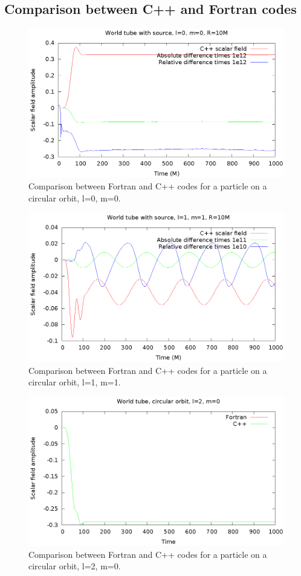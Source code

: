 \subsection{Comparison between C++ and Fortran codes}
\begin{figure}
  \includegraphics{wtcircl0m0}
  \caption{Comparison between Fortran and C++ codes for a particle on a circular orbit, l=0, m=0.}
\end{figure}
\begin{figure}
  \includegraphics{wtcircl1m1}
  \caption{Comparison between Fortran and C++ codes for a particle on a circular orbit, l=1, m=1.}
\end{figure}
\begin{figure}
  \includegraphics{wtcircl2m0}
  \caption{Comparison between Fortran and C++ codes for a particle on a circular orbit, l=2, m=0.}
\end{figure}
